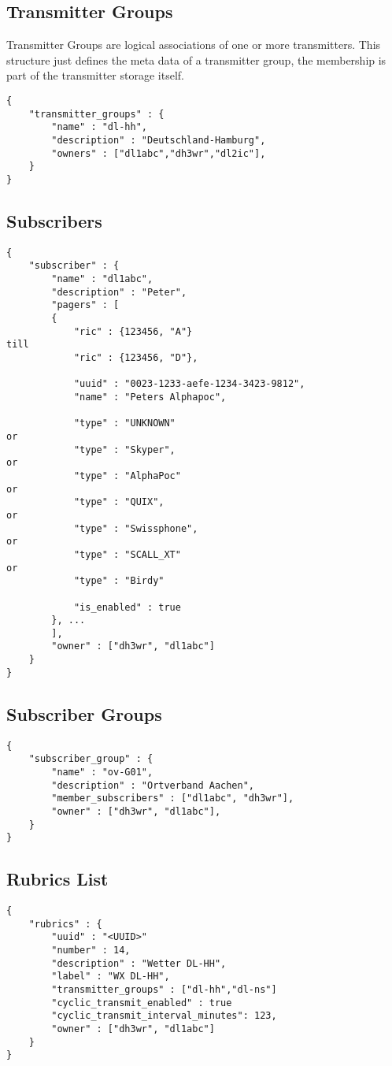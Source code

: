 \documentclass[a4paper]{article}
\begin{document}
\subsection{Transmitter Groups}
Transmitter Groups are logical associations of one or more transmitters. This structure just defines the meta data of a transmitter group, the membership is part of the transmitter storage itself.

\begin{lstlisting}
{
    "transmitter_groups" : {
        "name" : "dl-hh",
        "description" : "Deutschland-Hamburg",
        "owners" : ["dl1abc","dh3wr","dl2ic"],
    }
}
\end{lstlisting}

    
\subsection{Subscribers}
\begin{lstlisting}
{
    "subscriber" : {
        "name" : "dl1abc",
        "description" : "Peter",
        "pagers" : [
		{
        	"ric" : {123456, "A"}
till
			"ric" : {123456, "D"},

			"uuid" : "0023-1233-aefe-1234-3423-9812",
    		"name" : "Peters Alphapoc",

			"type" : "UNKNOWN"
or
			"type" : "Skyper",
or
			"type" : "AlphaPoc"
or
			"type" : "QUIX",
or
			"type" : "Swissphone",
or
			"type" : "SCALL_XT"
or
			"type" : "Birdy"

			"is_enabled" : true
        }, ...
        ],
	    "owner" : ["dh3wr", "dl1abc"]
    }
}
\end{lstlisting}

\subsection{Subscriber Groups}

\begin{lstlisting}
{
    "subscriber_group" : {
        "name" : "ov-G01",
        "description" : "Ortverband Aachen",
        "member_subscribers" : ["dl1abc", "dh3wr"],
    	"owner" : ["dh3wr", "dl1abc"],
    }
}
\end{lstlisting}

\subsection{Rubrics List}
\label{rubric_list}

\begin{lstlisting}
{
    "rubrics" : {
    	"uuid" : "<UUID>"
        "number" : 14,
        "description" : "Wetter DL-HH",
        "label" : "WX DL-HH",
        "transmitter_groups" : ["dl-hh","dl-ns"]
    	"cyclic_transmit_enabled" : true
        "cyclic_transmit_interval_minutes": 123,
    	"owner" : ["dh3wr", "dl1abc"]
    }
}
\end{lstlisting}
\end{document}
